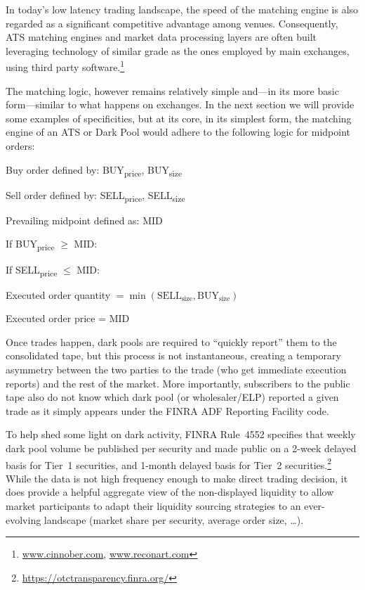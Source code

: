 In today's low latency trading landscape, the speed of the matching engine is also regarded as a significant competitive advantage among venues. Consequently, ATS  matching engines and market data processing layers are often built leveraging technology of similar grade as the ones employed by main exchanges, using third party software.\footnote{\url{www.cinnober.com}, \url{www.reconart.com}}


The matching logic, however remains relatively simple and---in its more basic form---similar to what happens on exchanges. In the next section we will provide some examples of specificities, but at its core, in its simplest form, the matching engine of an ATS or Dark Pool would adhere to the following logic for midpoint orders: \twomedskip


\noindent Buy order defined by: BUY\textsubscript{price}, BUY\textsubscript{size} \par
\noindent Sell order defined by: SELL\textsubscript{price}, SELL\textsubscript{size}  \par
\noindent Prevailing midpoint defined as: MID \twomedskip

\noindent If BUY\textsubscript{price} $\geq$ MID: \par
\indent If SELL\textsubscript{price} $\leq$ MID: \par
\indent\indent Executed order quantity $= \min(\text{SELL}_{\text{size}}, \text{BUY}_{\text{size}})$ \par
\indent\indent Executed order price = MID \twomedskip


Once trades happen, dark pools are required to ``quickly report'' them to the consolidated tape, but this process is not instantaneous, creating a temporary asymmetry between the two parties to the trade (who get immediate execution reports) and the rest of the market. More importantly, subscribers to the public tape also do not know which dark pool (or wholesaler/ELP) reported a given trade as it simply appears under the FINRA ADF Reporting Facility code.


To help shed some light on dark activity, FINRA Rule~4552 specifies that weekly dark pool volume be published per security and made public on a 2-week delayed basis for Tier~1 securities, and 1-month delayed basis for Tier~2 securities.\footnote{\url{https://otctransparency.finra.org/}} While the data is not high frequency enough to make direct trading decision, it does provide a helpful aggregate view of the non-displayed liquidity to allow market participants to adapt their liquidity sourcing strategies to an ever-evolving landscape (market share per security, average order size, \dots).


